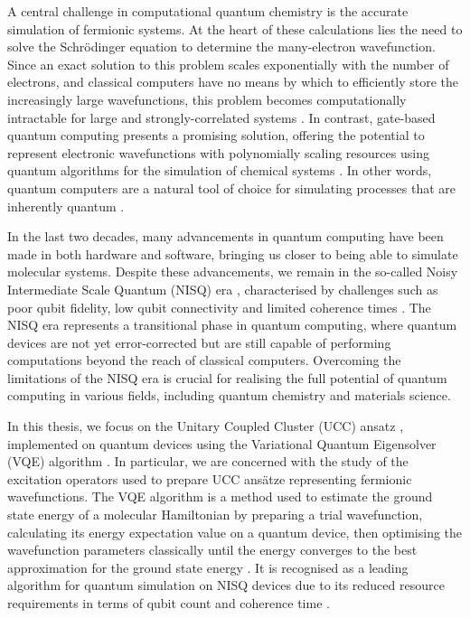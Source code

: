A central challenge in computational quantum chemistry is the accurate simulation of fermionic systems. At the heart of these calculations lies the need to solve the Schrödinger equation to determine the many-electron wavefunction. Since an exact solution to this problem scales exponentially with the number of electrons, and classical computers have no means by which to efficiently store the increasingly large wavefunctions, this problem becomes computationally intractable for large and strongly-correlated systems \cite{Szalay2011}. In contrast, gate-based quantum computing presents a promising solution, offering the potential to represent electronic wavefunctions with polynomially scaling resources using quantum algorithms for the simulation of chemical systems \cite{Kassal2011}. In other words, quantum computers are a natural tool of choice for simulating processes that are inherently quantum \cite{Yeung2020}.

In the last two decades, many advancements in quantum computing have been made in both hardware and software, bringing us closer to being able to simulate molecular systems. Despite these advancements, we remain in the so-called Noisy Intermediate Scale Quantum (NISQ) era \cite{Preskill2018}, characterised by challenges such as poor qubit fidelity, low qubit connectivity and limited coherence times \cite{Poulin2014}. The NISQ era represents a transitional phase in quantum computing, where quantum devices are not yet error-corrected but are still capable of performing computations beyond the reach of classical computers. Overcoming the limitations of the NISQ era is crucial for realising the full potential of quantum computing in various fields, including quantum chemistry and materials science.


In this thesis, we focus on the Unitary Coupled Cluster (UCC) ansatz \cite{Romero2018}, implemented on quantum devices using the Variational Quantum Eigensolver (VQE) algorithm \cite{Wecker2015}. In particular, we are concerned with the study of the excitation operators used to prepare UCC ansätze representing fermionic wavefunctions. The VQE algorithm is a method used to estimate the ground state energy of a molecular Hamiltonian by preparing a trial wavefunction, calculating its energy expectation value on a quantum device, then optimising the wavefunction parameters classically until the energy converges to the best approximation for the ground state energy \cite{McClean2016}. It is recognised as a leading algorithm for quantum simulation on NISQ devices due to its reduced resource requirements in terms of qubit count and coherence time \cite{Kirby2020}.

